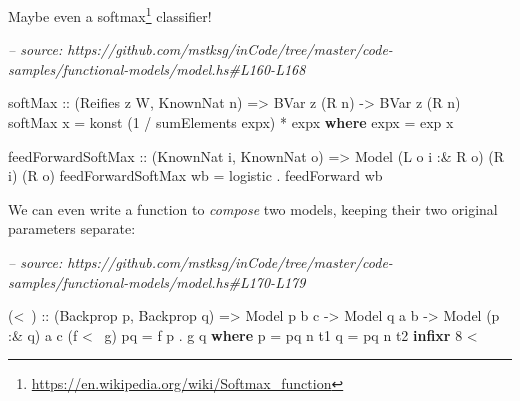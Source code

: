 \documentclass[]{article}
\newenvironment{Shaded}{}{}
\newcommand{\CommentTok}[1]{\textcolor[rgb]{0.38,0.63,0.69}{\textit{#1}}}
\newcommand{\DataTypeTok}[1]{\textcolor[rgb]{0.56,0.13,0.00}{#1}}
\newcommand{\DecValTok}[1]{\textcolor[rgb]{0.25,0.63,0.44}{#1}}
\newcommand{\FunctionTok}[1]{\textcolor[rgb]{0.02,0.16,0.49}{#1}}
\newcommand{\KeywordTok}[1]{\textcolor[rgb]{0.00,0.44,0.13}{\textbf{#1}}}
\newcommand{\NormalTok}[1]{#1}
\newcommand{\OtherTok}[1]{\textcolor[rgb]{0.00,0.44,0.13}{#1}}
\renewcommand{\href}[2]{#2\footnote{\url{#1}}}
\begin{document}
Maybe even a \href{https://en.wikipedia.org/wiki/Softmax_function}{softmax}
classifier!

\begin{Shaded}
\begin{Highlighting}[]
\CommentTok{-- source: https://github.com/mstksg/inCode/tree/master/code-samples/functional-models/model.hs#L160-L168}

\OtherTok{softMax ::}\NormalTok{ (}\DataTypeTok{Reifies}\NormalTok{ z }\DataTypeTok{W}\NormalTok{, }\DataTypeTok{KnownNat}\NormalTok{ n) }\OtherTok{=>} \DataTypeTok{BVar}\NormalTok{ z (}\DataTypeTok{R}\NormalTok{ n) }\OtherTok{->} \DataTypeTok{BVar}\NormalTok{ z (}\DataTypeTok{R}\NormalTok{ n)}
\NormalTok{softMax x }\FunctionTok{=}\NormalTok{ konst (}\DecValTok{1} \FunctionTok{/}\NormalTok{ sumElements expx) }\FunctionTok{*}\NormalTok{ expx}
  \KeywordTok{where}
\NormalTok{    expx }\FunctionTok{=}\NormalTok{ exp x}

\NormalTok{feedForwardSoftMax}
\OtherTok{    ::}\NormalTok{ (}\DataTypeTok{KnownNat}\NormalTok{ i, }\DataTypeTok{KnownNat}\NormalTok{ o)}
    \OtherTok{=>} \DataTypeTok{Model}\NormalTok{ (}\DataTypeTok{L}\NormalTok{ o i }\FunctionTok{:&} \DataTypeTok{R}\NormalTok{ o) (}\DataTypeTok{R}\NormalTok{ i) (}\DataTypeTok{R}\NormalTok{ o)}
\NormalTok{feedForwardSoftMax wb }\FunctionTok{=}\NormalTok{ logistic }\FunctionTok{.}\NormalTok{ feedForward wb}
\end{Highlighting}
\end{Shaded}

We can even write a function to \emph{compose} two models, keeping their two
original parameters separate:

\begin{Shaded}
\begin{Highlighting}[]
\CommentTok{-- source: https://github.com/mstksg/inCode/tree/master/code-samples/functional-models/model.hs#L170-L179}

\NormalTok{(}\FunctionTok{<~}\NormalTok{)}
\OtherTok{    ::}\NormalTok{ (}\DataTypeTok{Backprop}\NormalTok{ p, }\DataTypeTok{Backprop}\NormalTok{ q)}
    \OtherTok{=>} \DataTypeTok{Model}\NormalTok{     p    b c}
    \OtherTok{->} \DataTypeTok{Model}\NormalTok{       q  a b}
    \OtherTok{->} \DataTypeTok{Model}\NormalTok{ (p }\FunctionTok{:&}\NormalTok{ q) a c}
\NormalTok{(f }\FunctionTok{<~}\NormalTok{ g) pq }\FunctionTok{=}\NormalTok{ f p }\FunctionTok{.}\NormalTok{ g q}
  \KeywordTok{where}
\NormalTok{    p }\FunctionTok{=}\NormalTok{ pq }\FunctionTok{^^.}\NormalTok{ t1}
\NormalTok{    q }\FunctionTok{=}\NormalTok{ pq }\FunctionTok{^^.}\NormalTok{ t2}
\KeywordTok{infixr} \DecValTok{8} \FunctionTok{<~}
\end{Highlighting}
\end{Shaded}
\end{document}
